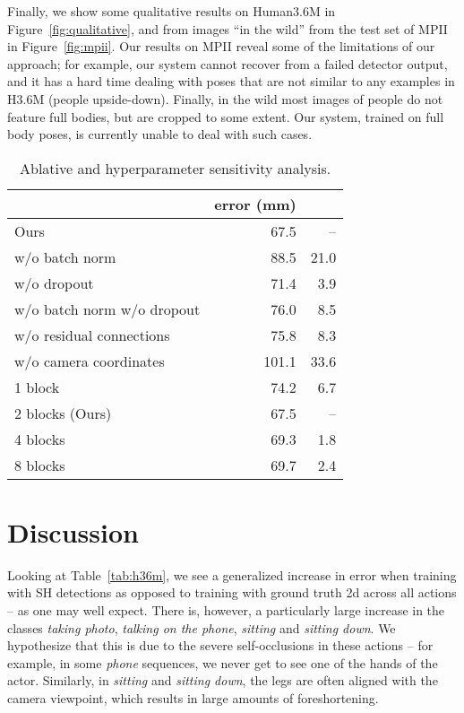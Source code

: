 \documentclass[10pt,twocolumn,letterpaper]{article}
\begin{document}
Finally, we show some qualitative results on Human3.6M in Figure~\ref{fig:qualitative}, and from images ``in the wild'' from the test set of MPII in Figure~\ref{fig:mpii}. Our results on MPII reveal some of the limitations of our approach; for example, our system cannot recover from a failed detector output, and it has a hard time dealing with poses that are not similar to any examples in H3.6M (\eg people upside-down).
Finally, in the wild most images of people do not feature full bodies, but are cropped to some extent. Our system, trained on full body poses, is currently unable to deal with such cases.

\begin{table}
\centering
\hspace{-3mm}
\begin{tabular}{@{}lrr@{}}
\toprule
 & error (mm) & \\
 \midrule
Ours & 67.5 & --\\
w/o batch norm & 88.5 & 21.0\\
w/o dropout & 71.4 & 3.9\\
w/o batch norm w/o dropout & 76.0 & 8.5\\
w/o residual connections&  75.8 & 8.3\\
w/o camera coordinates & 101.1 & 33.6\\
\midrule
1 block & 74.2 & 6.7\\
2 blocks (Ours) & 67.5 & --\\
4 blocks & 69.3 & 1.8\\
8 blocks & 69.7 & 2.4\\
\bottomrule
\end{tabular}
\vspace{3mm}
\caption{Ablative and hyperparameter sensitivity analysis.}
\label{tab:ablative}
\end{table}

\section{Discussion}

Looking at Table~\ref{tab:h36m}, we see a generalized increase in error when training with SH detections as opposed to training with ground truth 2d across all actions -- as one may well expect. There is, however, a particularly large increase in the classes \emph{taking photo}, \emph{talking on the phone}, \emph{sitting} and \emph{sitting down}. We hypothesize that this is due to the severe self-occlusions in these actions -- for example, in some \emph{phone} sequences, we never get to see one of the hands of the actor. Similarly, in \emph{sitting} and \emph{sitting down}, the legs are often aligned with the camera viewpoint, which results in large amounts of foreshortening.
\end{document}

